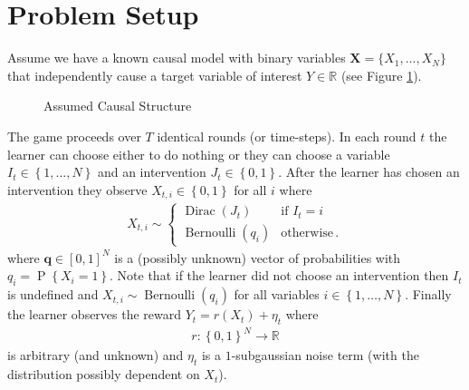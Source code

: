 \documentclass{article}
\newcommand{\R}{\mathbb R}
\newcommand{\set}[1]{\left\{#1\right\}}
\newcommand{\eq}[1]{\begin{align*}#1\end{align*}}
\renewcommand{\P}[1]{\operatorname{P}\left\{#1\right\}}
\theoremstyle{plain}
\theoremstyle{definition}
\begin{document}
\section{Problem Setup}

\newcommand{\bernoulli}{\operatorname{Bernoulli}}
\newcommand{\dirac}{\operatorname{Dirac}}

Assume we have a known causal model with binary variables $\boldsymbol{X} = \{X_{1},\ldots,X_{N}\}$ that independently cause a 
target variable of interest $Y \in \R$ (see Figure \ref{fig:causalStructure}).
\begin{figure}[h]
\centering
\caption{Assumed Causal Structure}
\label{fig:causalStructure}
\end{figure}


The game proceeds over $T$ identical rounds (or time-steps).
In each round $t$ the learner can choose either to do nothing or they can choose a variable $I_t \in \set{1,\ldots,N}$ and
an intervention $J_t \in \set{0,1}$. After the learner has chosen an intervention they observe $X_{t,i} \in \set{0,1}$ for all $i$ where
\eq{
X_{t,i} \sim \begin{cases}
\dirac(J_t) & \text{if } I_t = i \\
\bernoulli(q_i) & \text{otherwise}\,.
\end{cases}
}
where $\boldsymbol{q} \in [0,1]^N$ is a (possibly unknown) vector of probabilities with $q_i = \P{X_i = 1}$. Note that if the learner did not choose an intervention then $I_t$ is undefined
and $X_{t,i} \sim \bernoulli(q_i)$ for all variables $i \in \set{1,\ldots,N}$.
Finally the learner observes the reward $Y_t = r(X_t) + \eta_t$ where 
\eq{
r : \set{0,1}^N \to \R
}
is arbitrary (and unknown) 
and $\eta_t$ is a $1$-subgaussian noise
term (with the distribution possibly dependent on $X_t$). 
\end{document}
